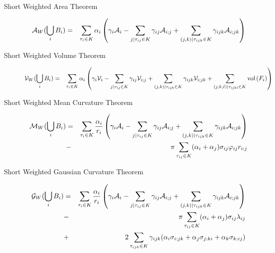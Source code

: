 \documentclass[11 pt]{article}
\newcommand {\mm}[1] {\ifmmode{#1}\else{\mbox{\(#1\)}}\fi}
\theoremstyle{plain} \theorembodyfont{\rmfamily}
\newcommand{\tsx}           {\mm{\tau}}
\newcommand{\Volume}[1]     {\mm{\rm vol\,}{#1}}
\begin{document}
\begin{description}
  \item[{\sc Short Weighted Area Theorem}]
   \begin{eqnarray}
    \mathcal{A}_W(\bigcup_i B_i) &=& \sum_{\tsx_i \in K} \alpha_i \left(\gamma_i \mathcal{A}_i
   - \sum_{j | \tsx_{ij} \in K} \gamma_{ij} \mathcal{A}_{i;j} 
    + \sum_{(j,k) | \tsx_{ijk} \in K}  \gamma_{ijk} \mathcal{A}_{i;jk} \right) \nonumber \\
          \label{eqn:wsurf2}
          \end{eqnarray}
\end{description}
\begin{description}
  \item[{\sc Short Weighted Volume Theorem}]
    \begin{eqnarray}
    \mathcal{V}_W(\bigcup_i B_i) &=& \sum_{\tsx_i \in K} \alpha_i \left( \gamma_{i} \mathcal{V}_i
    - \sum_{j | \tsx_{ij} \in K} \gamma_{ij} \mathcal{V}_{i;j} 
    + \sum_{(j,k) | \tsx_{ijk} \in K} \gamma_{ijk} \mathcal{V}_{i;jk}  +\sum_{(j,k,l) | \tsx_{ijkl} \in K} \Volume{(F_i)} \right) \nonumber \\
          \label{eqn:wvol2}
         \end{eqnarray}
\end{description}
\begin{description}
  \item[{\sc Short Weighted Mean Curvature Theorem}]
    \begin{eqnarray}
    \mathcal{M}_W(\bigcup_i B_i) &=& \sum_{\tsx_i \in K} \frac{\alpha_i}{r_i} \left(\gamma_i \mathcal{A}_i
   - \sum_{j | \tsx_{ij} \in K} \gamma_{ij} \mathcal{A}_{i;j} 
    + \sum_{(j,k) | \tsx_{ijk} \in K}  \gamma_{ijk} \mathcal{A}_{i;jk} \right) \nonumber \\    
    &-&  \pi \sum_{\tsx_{ij} \in K} (\alpha_i+\alpha_j) \sigma_{ij} \varphi_{ij} r_{i:j}
          \label{eqn:wmean2}
          \end{eqnarray}
\end{description}
\begin{description}
  \item[{\sc Short Weighted Gaussian Curvature Theorem}]
    \begin{eqnarray}
\mathcal{G}_W(\bigcup_i B_i) &=& \sum_{\tsx_i \in K} \frac{\alpha_i}{r_i} \left(\gamma_i \mathcal{A}_i
    - \sum_{j | \tsx_{ij} \in K} \gamma_{ij} \mathcal{A}_{i;j} 
    + \sum_{(j,k) | \tsx_{ijk} \in K}  \gamma_{ijk} \mathcal{A}_{i;jk} \right) \nonumber \\    
    &-&  \pi \sum_{\tsx_{ij} \in K} (\alpha_i+\alpha_j) \sigma_{ij} \lambda_{ij} \nonumber \\
   &+& 2 \sum_{\tsx_{ijk} \in K} \gamma_{ijk} (\alpha_i \sigma_{i:jk} + \alpha_j \sigma_{j:ki} + \alpha_k \sigma_{k: ij} ) \nonumber \\
         \label{eqn:wgauss2}
          \end{eqnarray}
\end{description}
\end{document}
